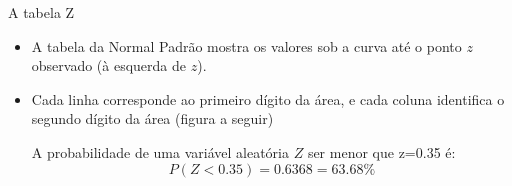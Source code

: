 \documentclass{beamer}
\begin{document}
\begin{frame}{A tabela Z}
  \begin{itemize}
  \item A tabela da Normal Padrão mostra os valores sob a curva até o
    ponto $z$ observado (à esquerda de $z$).
  \item Cada linha corresponde ao primeiro dígito da área, e cada
    coluna identifica o segundo dígito da área (figura a seguir)
    \begin{example}
      A probabilidade de uma variável aleatória $Z$ ser menor que
      z=0.35 é:
      \begin{displaymath}
        P(Z < 0.35)= 0.6368 = 63.68\%
      \end{displaymath}
    \end{example}
  \end{itemize}
\end{frame}
\end{document}
